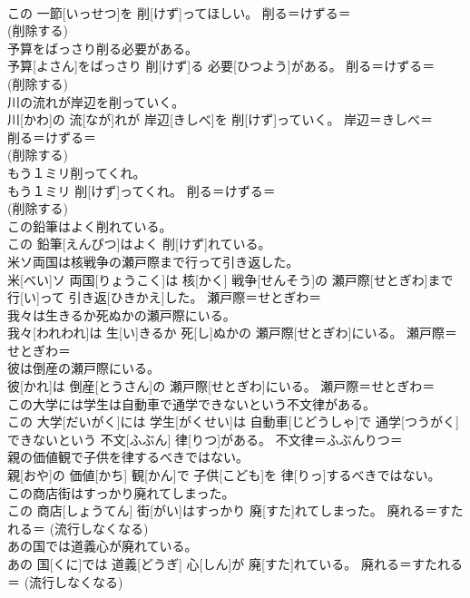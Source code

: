 \documentclass[8pt]{extreport}
\begin{document}
\begin{CJK}{UTF8}{min}
{\\	この 一節[いっせつ]を 削[けず]ってほしい。	削る＝けずる＝ 
\\	(削除する) 
\\	予算をばっさり削る必要がある。	
\\	予算[よさん]をばっさり 削[けず]る 必要[ひつよう]がある。	削る＝けずる＝ 
\\	(削除する) 
\\	川の流れが岸辺を削っていく。	
\\	川[かわ]の 流[なが]れが 岸辺[きしべ]を 削[けず]っていく。	岸辺＝きしべ＝ 
\\	削る＝けずる＝ 
\\	(削除する) 
\\	もう１ミリ削ってくれ。	
\\	もう１ミリ 削[けず]ってくれ。	削る＝けずる＝ 
\\	(削除する) 
\\	この鉛筆はよく削れている。	
\\	この 鉛筆[えんぴつ]はよく 削[けず]れている。	
\\	米ソ両国は核戦争の瀬戸際まで行って引き返した。	
\\	米[べい]ソ 両国[りょうこく]は 核[かく] 戦争[せんそう]の 瀬戸際[せとぎわ]まで 行[い]って 引き返[ひきかえ]した。	瀬戸際＝せとぎわ＝ 
\\	我々は生きるか死ぬかの瀬戸際にいる。	
\\	我々[われわれ]は 生[い]きるか 死[し]ぬかの 瀬戸際[せとぎわ]にいる。	瀬戸際＝せとぎわ＝ 
\\	彼は倒産の瀬戸際にいる。	
\\	彼[かれ]は 倒産[とうさん]の 瀬戸際[せとぎわ]にいる。	瀬戸際＝せとぎわ＝ 
\\	この大学には学生は自動車で通学できないという不文律がある。	
\\	この 大学[だいがく]には 学生[がくせい]は 自動車[じどうしゃ]で 通学[つうがく]できないという 不文[ふぶん] 律[りつ]がある。	不文律＝ふぶんりつ＝ 
\\	親の価値観で子供を律するべきではない。	
\\	親[おや]の 価値[かち] 観[かん]で 子供[こども]を 律[りっ]するべきではない。	
\\	この商店街はすっかり廃れてしまった。	
\\	この 商店[しょうてん] 街[がい]はすっかり 廃[すた]れてしまった。	廃れる＝すたれる＝ (流行しなくなる) 
\\	あの国では道義心が廃れている。	
\\	あの 国[くに]では 道義[どうぎ] 心[しん]が 廃[すた]れている。	廃れる＝すたれる＝ (流行しなくなる) 
}
\end{CJK}
\end{document}
